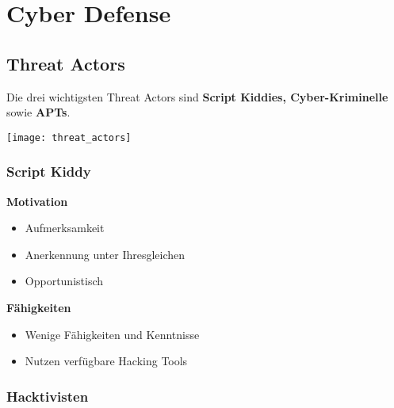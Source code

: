 

\section{Cyber Defense}

\subsection{Threat Actors}
Die drei wichtigsten Threat Actors sind \textbf{Script Kiddies, Cyber-Kriminelle} sowie \textbf{APTs}.

\begin{center}
    \texttt{[image: threat\_actors]}
\end{center}

\subsubsection{Script Kiddy}

\begin{minipage}{0.5\linewidth}
    \textbf{Motivation}
    \begin{itemize}
        \item Aufmerksamkeit
        \item Anerkennung unter Ihresgleichen
        \item Opportunistisch
    \end{itemize}
\end{minipage}
\begin{minipage}{0.45\linewidth}
    \textbf{Fähigkeiten}\\
    \begin{itemize}
        \item Wenige Fähigkeiten und Kenntnisse
        \item Nutzen verfügbare Hacking Tools
    \end{itemize}
\end{minipage}

\subsubsection{Hacktivisten}

